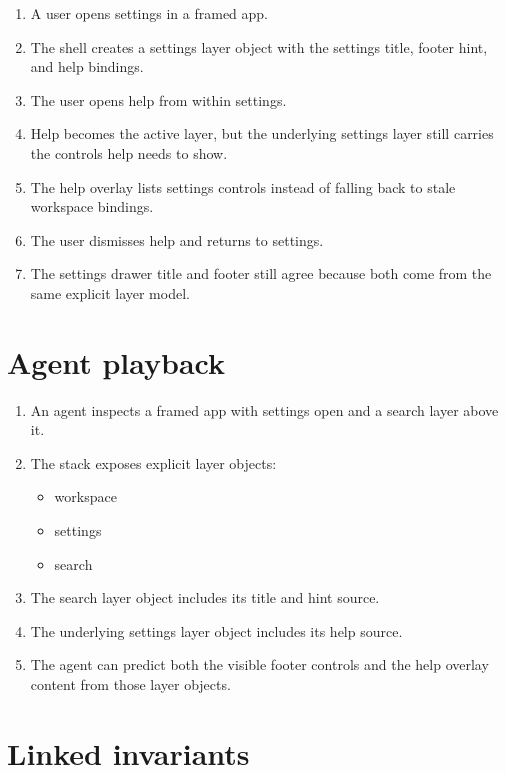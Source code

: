 \begin{enumerate}
\def\labelenumi{\arabic{enumi}.}
\tightlist
\item
  A user opens settings in a framed app.
\item
  The shell creates a settings layer object with the settings title, footer hint, and help bindings.
\item
  The user opens help from within settings.
\item
  Help becomes the active layer, but the underlying settings layer still carries the controls help needs to show.
\item
  The help overlay lists settings controls instead of falling back to stale workspace bindings.
\item
  The user dismisses help and returns to settings.
\item
  The settings drawer title and footer still agree because both come from the same explicit layer model.
\end{enumerate}

\section{Agent playback}\label{record-256-agent-playback}

\begin{enumerate}
\def\labelenumi{\arabic{enumi}.}
\tightlist
\item
  An agent inspects a framed app with settings open and a search layer above it.
\item
  The stack exposes explicit layer objects:

  \begin{itemize}
  \tightlist
  \item
    workspace
  \item
    settings
  \item
    search
  \end{itemize}
\item
  The search layer object includes its title and hint source.
\item
  The underlying settings layer object includes its help source.
\item
  The agent can predict both the visible footer controls and the help overlay content from those layer objects.
\end{enumerate}

\section{Linked invariants}\label{record-256-linked-invariants}

